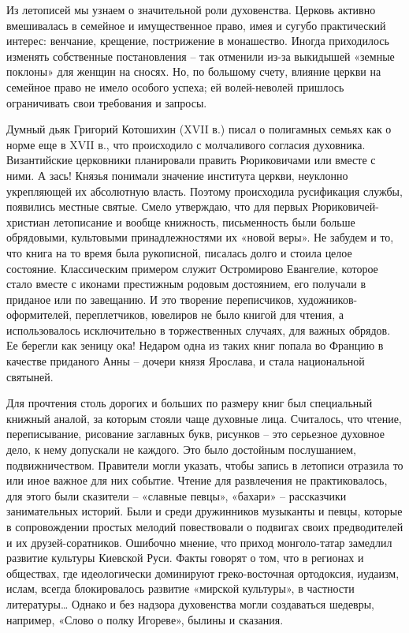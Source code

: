 Из летописей мы узнаем о значительной роли духовенства. Церковь активно
вмешивалась в семейное и имущественное право, имея и сугубо практический
интерес: венчание, крещение, пострижение в монашество. Иногда приходилось
изменять собственные постановления – так отменили из-за выкидышей «земные
поклоны» для женщин на сносях. Но, по большому счету, влияние церкви на
семейное право не имело особого успеха; ей волей-неволей пришлось ограничивать
свои требования и запросы.
	
Думный дьяк Григорий Котошихин (XVII в.) писал о полигамных семьях как о норме
еще в XVII в., что происходило с молчаливого согласия духовника. Византийские
церковники планировали править Рюриковичами или вместе с ними. А зась! Князья
понимали значение института церкви, неуклонно укрепляющей их абсолютную власть.
Поэтому происходила русификация службы, появились местные святые. Смело
утверждаю, что для первых Рюриковичей-христиан летописание и вообще книжность,
письменность были больше обрядовыми, культовыми принадлежностями их «новой
веры». Не забудем и то, что книга на то время была рукописной, писалась долго и
стоила целое состояние. Классическим примером служит Остромирово Евангелие,
которое стало вместе с иконами престижным родовым достоянием, его получали в
приданое или по завещанию. И это творение переписчиков, художников-оформителей,
переплетчиков, ювелиров не было книгой для чтения, а использовалось
исключительно в торжественных случаях, для важных обрядов. Ее берегли как
зеницу ока! Недаром одна из таких книг попала во Францию в качестве приданого
Анны – дочери князя Ярослава, и стала национальной святыней.

Для прочтения столь дорогих и больших по размеру книг был специальный книжный
аналой, за которым стояли чаще духовные лица. Считалось, что чтение,
переписывание, рисование заглавных букв, рисунков – это серьезное духовное
дело, к нему допускали не каждого. Это было достойным послушанием,
подвижничеством. Правители могли указать, чтобы запись в летописи отразила то
или иное важное для них событие. Чтение для развлечения не практиковалось, для
этого были сказители – «славные певцы», «бахари» – рассказчики занимательных
историй. Были и среди дружинников музыканты и певцы, которые в сопровождении
простых мелодий повествовали о подвигах своих предводителей и их
друзей-соратников. Ошибочно мнение, что приход монголо-татар замедлил развитие
культуры Киевской Руси. Факты говорят о том, что в регионах и обществах, где
идеологически доминируют греко-восточная ортодоксия, иудаизм, ислам, всегда
блокировалось развитие «мирской культуры», в частности литературы… Однако и без
надзора духовенства могли создаваться шедевры, например, «Слово о полку
Игореве», былины и сказания.

